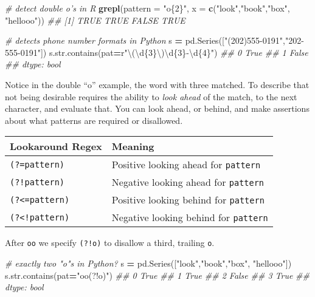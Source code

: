 \documentclass[12pt,krantz2]{krantz}
\makeatletter
\newenvironment{Shaded}{\begin{snugshade}}{\end{snugshade}}
\newcommand{\BuiltInTok}[1]{#1}
\newcommand{\CommentTok}[1]{\textcolor[rgb]{0.37,0.37,0.37}{\textit{#1}}}
\newcommand{\DataTypeTok}[1]{\textcolor[rgb]{0.27,0.27,0.27}{#1}}
\newcommand{\KeywordTok}[1]{\textcolor[rgb]{0.27,0.27,0.27}{\textbf{#1}}}
\newcommand{\NormalTok}[1]{#1}
\newcommand{\OperatorTok}[1]{\textcolor[rgb]{0.43,0.43,0.43}{\textbf{#1}}}
\newcommand{\SpecialCharTok}[1]{\textcolor[rgb]{0,0,0}{#1}}
\newcommand{\StringTok}[1]{\textcolor[rgb]{0.5,0.5,0.5}{#1}}
\newcommand{\VerbatimStringTok}[1]{\textcolor[rgb]{0.5,0.5,0.5}{#1}}
\newenvironment{kframe}{%
\medskip{}
\setlength{\fboxsep}{.8em}
 \def\at@end@of@kframe{}%
 \ifinner\ifhmode%
  \def\at@end@of@kframe{\end{minipage}}%
  \begin{minipage}{\columnwidth}%
 \fi\fi%
 \def\FrameCommand##1{\hskip\@totalleftmargin \hskip-\fboxsep
 \colorbox{shadecolor}{##1}\hskip-\fboxsep
     \hskip-\linewidth \hskip-\@totalleftmargin \hskip\columnwidth}%
 \MakeFramed {\advance\hsize-\width
   \@totalleftmargin\z@ \linewidth\hsize
   \@setminipage}}%
 {\par\unskip\endMakeFramed%
 \at@end@of@kframe}
\renewenvironment{Shaded}{\begin{kframe}}{\end{kframe}}
\makeatother
\begin{document}
\begin{Shaded}
\begin{Highlighting}[]
\CommentTok{# detect double o's in R}
\KeywordTok{grepl}\NormalTok{(}\DataTypeTok{pattern =} \StringTok{"o\{2\}"}\NormalTok{, }\DataTypeTok{x =} \KeywordTok{c}\NormalTok{(}\StringTok{"look"}\NormalTok{,}\StringTok{"book"}\NormalTok{,}\StringTok{"box"}\NormalTok{, }\StringTok{"hellooo"}\NormalTok{))}
\CommentTok{## [1]  TRUE  TRUE FALSE  TRUE}
\end{Highlighting}
\end{Shaded}

\begin{Shaded}
\begin{Highlighting}[]
\CommentTok{# detects phone number formats in Python}
\NormalTok{s }\OperatorTok{=}\NormalTok{ pd.Series([}\StringTok{"(202)555-0191"}\NormalTok{,}\StringTok{"202-555-0191"}\NormalTok{])}
\NormalTok{s.}\BuiltInTok{str}\NormalTok{.contains(pat}\OperatorTok{=}\VerbatimStringTok{r"\textbackslash{}(\textbackslash{}d}\SpecialCharTok{\{3\}}\VerbatimStringTok{\textbackslash{})\textbackslash{}d}\SpecialCharTok{\{3\}}\VerbatimStringTok{-\textbackslash{}d}\SpecialCharTok{\{4\}}\VerbatimStringTok{"}\NormalTok{)}
\CommentTok{## 0     True}
\CommentTok{## 1    False}
\CommentTok{## dtype: bool}
\end{Highlighting}
\end{Shaded}

Notice in the double ``o'' example, the word with three matched. To describe that not being desirable requires the ability to \emph{look ahead} of the match, to the next character, and evaluate that. You can look ahead, or behind, and make assertions about what patterns are required or disallowed.

\begin{longtable}[]{@{}ll@{}}
\toprule
Lookaround Regex & Meaning\tabularnewline
\midrule
\endhead
\texttt{(?=pattern)} & Positive looking ahead for \texttt{pattern}\tabularnewline
\texttt{(?!pattern)} & Negative looking ahead for \texttt{pattern}\tabularnewline
\texttt{(?\textless{}=pattern)} & Positive looking behind for \texttt{pattern}\tabularnewline
\texttt{(?\textless{}!pattern)} & Negative looking behind for \texttt{pattern}\tabularnewline
\bottomrule
\end{longtable}

After \texttt{oo} we specify \texttt{(?!o)} to disallow a third, trailing \texttt{o}.

\begin{Shaded}
\begin{Highlighting}[]
\CommentTok{# exactly two "o"s in Python?}
\NormalTok{s }\OperatorTok{=}\NormalTok{ pd.Series([}\StringTok{"look"}\NormalTok{,}\StringTok{"book"}\NormalTok{,}\StringTok{"box"}\NormalTok{, }\StringTok{"hellooo"}\NormalTok{])}
\NormalTok{s.}\BuiltInTok{str}\NormalTok{.contains(pat}\OperatorTok{=}\StringTok{"oo(?!o)"}\NormalTok{)}
\CommentTok{## 0     True}
\CommentTok{## 1     True}
\CommentTok{## 2    False}
\CommentTok{## 3     True}
\CommentTok{## dtype: bool}
\end{Highlighting}
\end{Shaded}
\end{document}
